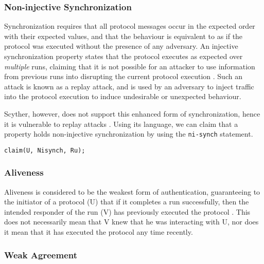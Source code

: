\subsubsection{Non-injective Synchronization}

Synchronization requires that all protocol messages occur in the expected order with their expected values, and that the behaviour is equivalent to as if the protocol was executed without the presence of any adversary. An injective synchronization property states that the protocol executes as expected over \emph{multiple} runs, claiming that it is not possible for an attacker to use information from previous runs into disrupting the current protocol execution \cite{cremers2005operational}. Such an attack is known as a replay attack, and is used by an adversary to inject traffic into the protocol execution to induce undesirable or unexpected behaviour.

Scyther, however, does not support this enhanced form of synchronization, hence it is vulnerable to replay attacks \cite{scyther-manual}. Using its language, we can claim that a property holds non-injective synchronization by using the \texttt{ni-synch} statement.\newline


\begin{lstlisting}
claim(U, Nisynch, Ru);

\end{lstlisting}


\subsubsection{Aliveness}

Aliveness is considered to be the weakest form of authentication, guaranteeing to the initiator of a protocol (U) that if it completes a run successfully, then the intended responder of the run (V) has previously executed the protocol \cite{lowe1997hierarchy}. This does not necessarily mean that V knew that he was interacting with U, nor does it mean that it has executed the protocol any time recently. 


\subsubsection{Weak Agreement}

